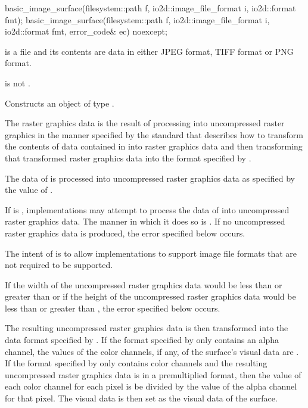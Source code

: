 %
\begin{itemdecl}
basic_image_surface(filesystem::path f, io2d::image_file_format i, io2d::format fmt);
basic_image_surface(filesystem::path f, io2d::image_file_format i, io2d::format fmt,
  error_code& ec) noexcept;
\end{itemdecl}
\begin{itemdescr}
\pnum
\requires
{} is a file and its contents are data in either JPEG format, TIFF format or PNG format.

\pnum
{} is not .

\pnum
\effects
Constructs an object of type .

\pnum
The raster graphics data is the result of processing  into uncompressed raster graphics in the manner specified by the standard that describes how to transform the contents of data contained in  into raster graphics data and then transforming that transformed raster graphics data into the format specified by .

\pnum
The data of  is processed into uncompressed raster graphics data as specified by the value of .

\pnum
If  is , implementations may attempt to process the data of  into uncompressed raster graphics data. The manner in which it does so is \unspecnorm. If no uncompressed raster graphics data is produced, the error specified below occurs.

\pnum
\begin{note}
The intent of  is to allow implementations to support image file formats that are not required to be supported.
\end{note}

\pnum
If the width of the uncompressed raster graphics data would be less than  or greater than  or if the height of the uncompressed raster graphics data would be less than  or greater than , the error specified below occurs.

\pnum
The resulting uncompressed raster graphics data is then transformed into the data format specified by . If the format specified by  only contains an alpha channel, the values of the color channels, if any, of the surface's visual data are \unspecnorm. If the format specified by  only contains color channels and the resulting uncompressed raster graphics data is in a premultiplied format, then the value of each color channel for each pixel is be divided by the value of the alpha channel for that pixel. The visual data is then set as the visual data of the surface.


\end{itemdescr}
